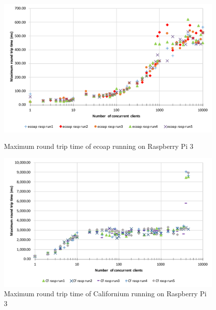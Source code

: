 \begin{figure}[!htbp]
\centering
\includegraphics[scale = 0.8]{ecoap_max_round_trip_time_rasp}
\caption{Maximum round trip time of ecoap running on Raspberry Pi 3}
\label{fig:ecoap_max_round_trip_time_rasp}
\includegraphics[scale = 0.8]{californium_max_round_trip_time_rasp}
\caption{Maximum round trip time of Californium running on Raspberry Pi 3}
\label{fig:californium_max_round_trip_time_rasp}
\end{figure}


